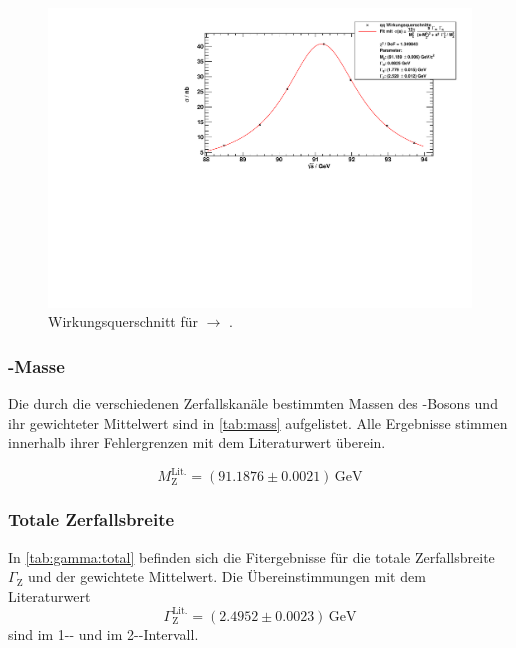 \begin{figure}[H]
    \begin{center}
        \includegraphics[width=\textwidth]{../img/crosssections_qq.pdf}
        \caption{Wirkungsquerschnitt für \ee $\to$ \qq.}
        \label{img:crosssection:qq}
    \end{center}
\end{figure}

\subsubsection{\Z-Masse}
Die durch die verschiedenen Zerfallskanäle bestimmten Massen des \Z-Bosons
und ihr gewichteter Mittelwert sind in \autoref{tab:mass} aufgelistet.
Alle Ergebnisse stimmen innerhalb ihrer Fehlergrenzen mit dem Literaturwert \cite{pdg} überein.

\begin{equation}
    M_\text{Z}^\text{Lit.} = (91.1876 \pm 0.0021)\,\text{GeV}
\end{equation}

\subsubsection{Totale Zerfallsbreite}
In \autoref{tab:gamma:total} befinden sich die Fitergebnisse für die totale Zerfallsbreite $\Gamma_\text{Z}$
und der gewichtete Mittelwert.
Die Übereinstimmungen mit dem Literaturwert
\begin{equation}
    \Gamma_\text{Z}^\text{Lit.} = (2.4952 \pm 0.0023)\,\text{GeV}
\end{equation}
sind im 1-\textsigma- und im 2-\textsigma-Intervall.


